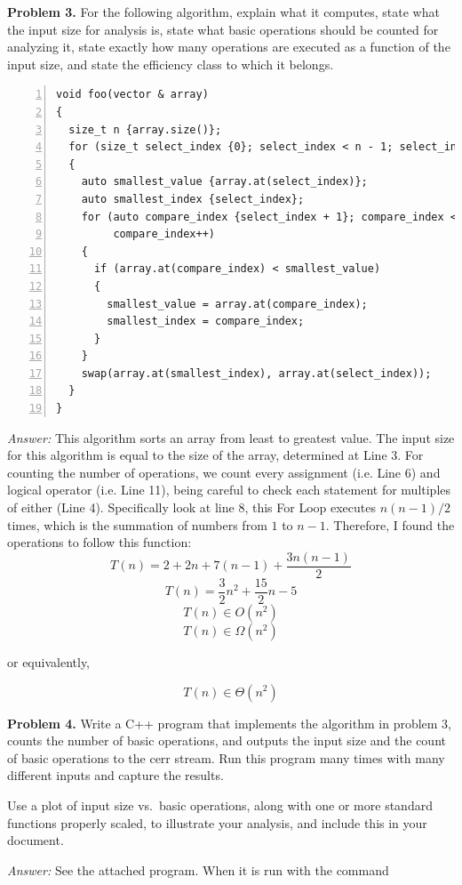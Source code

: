 \documentclass[11pt]{article}
\begin{document}
\newpage
\textbf{Problem 3.} For the following algorithm, explain what it
computes, state what the input size for analysis is, state what basic
operations should be counted for analyzing it, state exactly how many
operations are executed as a function of the input size, and state the
efficiency class to which it belongs.


\begin{Verbatim}[numbers=left,xleftmargin=5mm]
void foo(vector & array)
{
  size_t n {array.size()};
  for (size_t select_index {0}; select_index < n - 1; select_index++)
  {
    auto smallest_value {array.at(select_index)};
    auto smallest_index {select_index};
    for (auto compare_index {select_index + 1}; compare_index < n;
         compare_index++)
    {
      if (array.at(compare_index) < smallest_value)
      {
        smallest_value = array.at(compare_index);
        smallest_index = compare_index;
      }
    }
    swap(array.at(smallest_index), array.at(select_index));
  }
}
\end{Verbatim}

\textit{Answer:} This algorithm sorts an array from least to greatest value. The input size for this algorithm is equal to the size of the array, determined at Line 3. For counting the number of operations, we count every assignment (i.e. Line 6) and logical operator (i.e. Line 11), being careful to check each statement for multiples of either (Line 4). Specifically look at line 8, this For Loop executes $n(n-1)/2$ times, which is the summation of numbers from $1$ to $n-1$. Therefore, I found the operations to follow this function:
\[
T(n) = 2 + 2n + 7(n-1) + \frac{3n(n-1)}{2}
\]
\[
T(n) = \frac{3}{2}n^{2} + \frac{15}{2}n - 5 
\]
\[
  T(n) \in O(n^{2})
\]
\[
  T(n) \in \Omega(n^{2})
\]

or equivalently,

\[
T(n) \in \Theta(n^{2})
\]

\newpage
\textbf{Problem 4.} Write a C++ program that implements the algorithm
in problem 3, counts the number of basic operations, and outputs the
input size and the count of basic operations to the cerr stream. Run
this program many times with many different inputs and capture the
results.

Use a plot of input size vs.\ basic operations, along with one or more
standard functions properly scaled, to illustrate your analysis, and
include this in your document.

\textit{Answer:} See the attached program. When it is run with the
command
\end{document}
